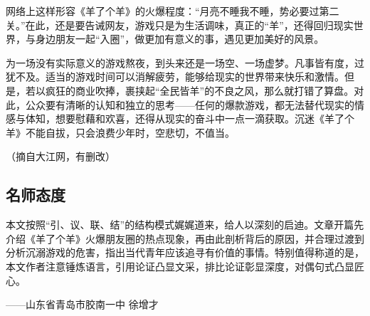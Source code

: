 网络上这样形容《羊了个羊》的火爆程度：“月亮不睡我不睡，势必要过第二关。”在此，还是要告诫网友，游戏只是为生活调味，真正的“羊”，还得回归现实世界，与身边朋友一起“入圈”，做更加有意义的事，遇见更加美好的风景。

为一场没有实际意义的游戏熬夜，到头来还是一场空、一场虚梦。凡事皆有度，过犹不及。适当的游戏时间可以消解疲劳，能够给现实的世界带来快乐和激情。但是，若以疯狂的商业吹捧，裹挟起“全民皆羊”的不良之风，那么就打错了算盘。对此，公众要有清晰的认知和独立的思考——任何的爆款游戏，都无法替代现实的情感与体知，想要慰藉和欢喜，还得从现实的奋斗中一点一滴获取。沉迷《羊了个羊》不能自拔，只会浪费少年时，空悲切，不值当。

（摘自大江网，有删改）

\subsection*{名师态度}

本文按照“引、议、联、结”的结构模式娓娓道来，给人以深刻的启迪。文章开篇先介绍《羊了个羊》火爆朋友圈的热点现象，再由此剖析背后的原因，并合理过渡到分析沉溺游戏的危害，指出当代青年应该追寻有价值的事情。特别值得称道的是，本文作者注意锤炼语言，引用论证凸显文采，排比论证彰显深度，对偶句式凸显匠心。

——山东省青岛市胶南一中 徐增才
